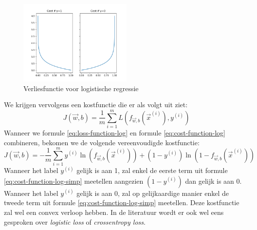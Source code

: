 \begin{figure}[h]
	\centering
	\includegraphics[width=0.5\textwidth]{images/10-loss-function-log.png}
	\caption{Verliesfunctie voor logistische regressie}
	\label{fig:loss-function-log}
\end{figure}
\noindent
We krijgen vervolgens een kostfunctie die er als volgt uit ziet:
\begin{equation}
	J(\vec{w}, b) = \frac{1}{m} \sum_{i=1}^{m} L(f_{\vec{w},b}(\vec{x}^{(i)}), y^{(i)})
	\label{eq:cost-function-log}
\end{equation}
\noindent
Wanneer we formule \ref{eq:loss-function-log} en formule \ref{eq:cost-function-log} combineren, bekomen we de volgende vereenvoudigde kostfunctie:
\begin{equation}
	J(\vec{w}, b) = -\frac{1}{m} \sum_{i=1}^{m} y^{(i)}\ln(f_{\vec{w},b}(\vec{x}^{(i)})) + (1 - y^{(i)}) \ln(1 - f_{\vec{w},b}(\vec{x}^{(i)})) 
	\label{eq:cost-function-log-simp}
\end{equation}
\noindent
Wanneer het label $y^{(i)}$ gelijk is aan 1, zal enkel de eerste term uit formule \ref{eq:cost-function-log-simp} meetellen aangezien $(1 - y^{(i)})$ dan gelijk is aan 0. Wanneer het label $y^{(i)}$ gelijk is aan 0, zal op gelijkaardige manier enkel de tweede term uit formule \ref{eq:cost-function-log-simp} meetellen. Deze kostfunctie zal wel een convex verloop hebben. In de literatuur wordt er ook wel eens gesproken over \textit{logistic loss} of \textit{crossentropy loss}.

